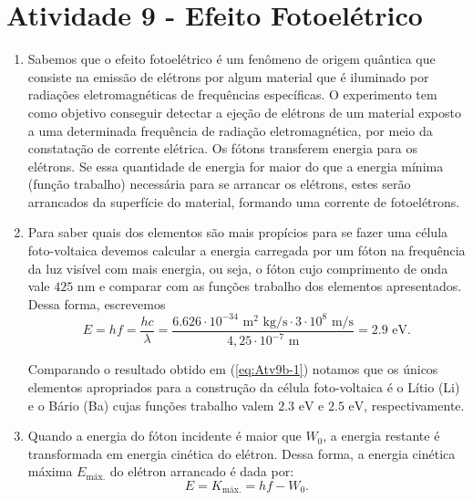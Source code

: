 \documentclass[12pt,a4paper]{article}
\begin{document}
\section*{Atividade 9 - Efeito Fotoelétrico}
    \begin{enumerate}[label = \alph*)]
        \item Sabemos que o efeito fotoelétrico é um fenômeno de origem quântica que consiste na emissão de elétrons por algum material que é iluminado por radiações eletromagnéticas de frequências específicas. O experimento tem como objetivo conseguir detectar a ejeção de elétrons de um material exposto a uma determinada frequência de radiação eletromagnética, por meio da constatação de corrente elétrica. Os fótons transferem energia para os elétrons. Se essa quantidade de energia for maior do que a energia mínima (função trabalho) necessária para se arrancar os elétrons, estes serão arrancados da superfície do material, formando uma corrente de fotoelétrons.


             
        \item Para saber quais dos elementos são mais propícios para se fazer uma célula foto-voltaica devemos calcular a energia carregada por um fóton na frequência da luz visível com mais energia, ou seja, o fóton cujo comprimento de onda vale $425\text{ nm}$ e comparar com as funções trabalho dos elementos apresentados. Dessa forma, escrevemos
        \begin{equation}\label{eq:Atv9b-1}
            E=hf=\frac{hc}{\lambda}=\frac{6.626\cdot10^{-34}\text{ m}^{2}\text{ kg/s}\cdot3\cdot10^{8}\text{ m/s}}{4,25\cdot10^{-7}\text{ m}}=2.9\text{ eV}.
        \end{equation}

        Comparando o resultado obtido em (\ref{eq:Atv9b-1}) notamos que os únicos elementos apropriados para a construção da célula foto-voltaica é o Lítio (Li) e o Bário (Ba) cujas funções trabalho valem $2.3\text{ eV}$ e $2.5\text{ eV}$, respectivamente.

        
        
        \item Quando a energia do fóton incidente é maior que $W_0$, a energia restante é transformada em energia cinética do elétron. Dessa forma, a energia cinética máxima $E_{\text{máx.}}$ do elétron arrancado é dada por:
        \begin{equation}\label{eq:Atv9c-1}
            E=K_{\text{máx.}}=hf-W_0.
        \end{equation}


\end{enumerate}
\end{document}
